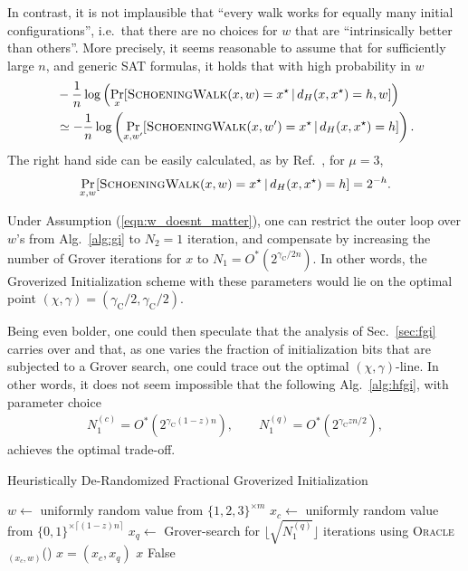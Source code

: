 \documentclass[a4paper,aps,floatfix]{revtex4}
\begin{document}
In contrast, it is not implausible that ``every walk works for equally many initial configurations'', i.e.\ that there are no choices for $w$ that are ``intrinsically better than others''.
More precisely, it seems reasonable to assume that for 
sufficiently large $n$, and
generic SAT formulas, it holds that with high probability in $w$
\begin{align}\label{eqn:w_doesnt_matter}
	&-\frac1{n} \log \left(
	\Pr_x[ \textsc{SchoeningWalk}(x, w) = x^\star \,|\, d_H(x,x^\star)=h,w] \right) \\ \nonumber
	&\simeq
	-\frac1{n} \log\left(
		\Pr_{x,w'}[ \textsc{SchoeningWalk}(x, w') = x^\star \,|\, d_H(x,x^\star)=h]
	\right).
\end{align}
The right hand side can be easily calculated, as by Ref.~\cite{Schoening99}, for $\mu=3$, 
\begin{align*}
	\Pr_{x,w}[ \textsc{SchoeningWalk}(x, w) = x^\star \,|\, d_H(x,x^\star)=h]
	=
	2^{-h}.
\end{align*}

Under Assumption (\ref{eqn:w_doesnt_matter}), one can restrict the outer loop over $w$'s from Alg.~\ref{alg:gi} to $N_2=1$ iteration, and compensate by increasing the number of Grover iterations for $x$ to $N_1=O^*(2^{\gamma_{\mathrm{C}}/2n})$.
In other words, the Groverized Initialization scheme with these parameters would lie on the optimal point 
$(\chi,\gamma) = (\gamma_{\mathrm{C}}/2, \gamma_{\mathrm{C}}/2)$.

Being even bolder, one could then speculate that the analysis of Sec.~\ref{sec:fgi} carries 
over and that, as one varies the fraction of initialization bits that are subjected to a Grover search, one could trace out the optimal $(\chi,\gamma)$-line.
In other words, it does not seem impossible that the following Alg.~\ref{alg:hfgi}, with parameter choice
\begin{align*}
	N_1^{(c)} = O^*(2^{\gamma_{\mathrm{C}}(1-z)n}),
	\qquad
	N_1^{(q)} = O^*(2^{\gamma_{\mathrm{C}}zn/2}),
\end{align*}
achieves the optimal trade-off.

\begin{algorithm}[H]
	\caption{Heuristically De-Randomized Fractional Groverized Initialization}\label{alg:hfgi}
	\begin{algorithmic}[1]
			\State $w\leftarrow$ uniformly random value from $\{1, 2, 3\}^{\times m}$
				\State $x_c\leftarrow$ uniformly random value from $\{0,1\}^{\times \lceil(1-z)n\rceil}$
				\State $x_q\leftarrow$ Grover-search for $\Big\lfloor \sqrt{N_1^{(q)}}\Big\rfloor$ iterations using \textsc{Oracle$_{(x_c, w)}$}()
				\State $x=(x_c,x_q)$
						\State\Return $x$
					\EndIf
				\EndFor
			\State \Return False
	\end{algorithmic}
\end{algorithm}
\end{document}
